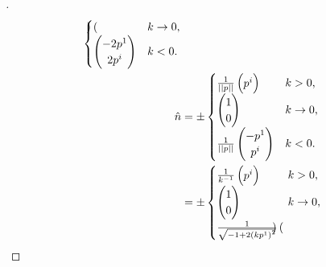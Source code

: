 \documentclass[stu, babel, american, biblatex, a4paper, leqno, draftall]{apa7}
\begin{document}
\begin{proof}[]
\begin{align*}
\begin{cases}
\begin{pmatrix}
            \end{pmatrix} & \text{$k\to 0$,} \\
            \begin{pmatrix}
                -2\tensor{p}{^1} \\
                2\tensor{p}{^i} \\
            \end{pmatrix} & \text{$k<0$.} \\
          \end{cases} \\
          \hat{n}
          &= \pm
            \begin{cases}
            \frac{1}{\norm{p}}
             \begin{pmatrix}
                 \tensor{p}{^i} \\
             \end{pmatrix} & \text{$k>0$,} \\
             \begin{pmatrix}
                 1 \\
                 0 \\
             \end{pmatrix} & \text{$k\to 0$,} \\
             \frac{1}{\norm{p}}
             \begin{pmatrix}
                 -\tensor{p}{^1} \\
                 \tensor{p}{^i} \\
             \end{pmatrix} & \text{$k<0$.} \\
           \end{cases} \\
           &= \pm
             \begin{cases}
             \frac{1}{k^{-1}}
              \begin{pmatrix}
                  \tensor{p}{^i} \\
              \end{pmatrix} & \text{$k>0$,} \\
              \begin{pmatrix}
                  1 \\
                  0 \\
              \end{pmatrix} & \text{$k\to 0$,} \\
              \frac{1}{\sqrt{-1+2\left(k\tensor{p}{^1}\right)^2}}
              \begin{pmatrix}

\end{pmatrix}
\end{cases}
\end{align*}
\end{proof}
\end{document}

